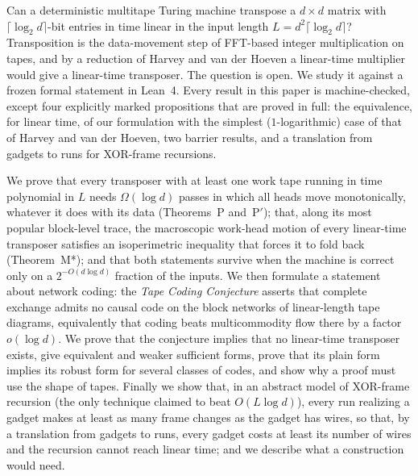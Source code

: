 Can a deterministic multitape Turing machine transpose a $d\times d$ matrix with $\lceil\log_2d\rceil$-bit
entries in time linear in the input length $L=d^2\lceil\log_2d\rceil$? Transposition is the data-movement step of FFT-based integer multiplication on tapes, and by a reduction of Harvey and van der Hoeven a
linear-time multiplier would give a linear-time transposer. The question is open. We study it against a frozen formal statement in Lean~4. Every result in this paper is machine-checked, except four explicitly marked propositions that are proved in full: the equivalence, for linear time, of our formulation with the simplest ($1$-logarithmic) case of that of Harvey and van der Hoeven, two barrier results, and a translation from gadgets to runs for XOR-frame recursions.

We prove that every transposer with at least one work tape running in time polynomial in $L$ needs $\Omega(\log d)$ passes in which all heads
move monotonically, whatever it does with its data (Theorems~P and~P$'$); that, along its most popular block-level
trace, the macroscopic work-head motion of every linear-time transposer satisfies an isoperimetric inequality that
forces it to fold back (Theorem~M*); and that both statements survive when the
machine is correct only on a $2^{-O(d\log d)}$ fraction of the inputs. We then formulate a statement about network coding: the \emph{Tape Coding Conjecture} asserts that complete exchange admits no
causal code on the block networks of linear-length tape diagrams, equivalently that coding beats multicommodity
flow there by a factor $o(\log d)$. We prove that the conjecture implies that no linear-time transposer exists,
give equivalent and weaker sufficient forms, prove that its plain form implies its robust form for several
classes of codes, and show why a proof must use the shape of tapes. Finally we show that, in an abstract model of XOR-frame recursion (the only technique claimed to beat
$O(L\log d)$), every run realizing a gadget makes at least as many frame changes as the gadget has wires, so that, by a translation from gadgets to runs, every gadget costs at least its number of wires and the recursion cannot reach linear time; and we describe what a construction would need.
